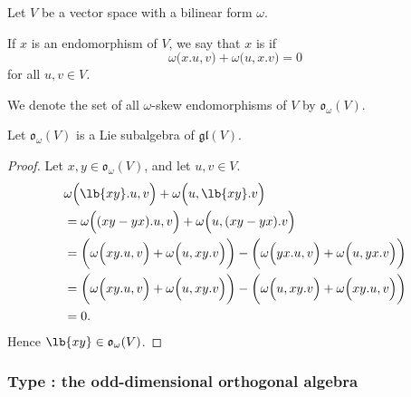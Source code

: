 \documentclass{article}
\DeclarePairedDelimiter\lb\lbrack\rbrack
\newcommand*\gl{\ensuremath{\mathfrak{gl}}}
\newcommand*\oalg{\ensuremath{\mathfrak{o}}}
\newcommand*\acts{.}
\begin{document}
\begin{definition}
    Let $V$ be a vector space with a bilinear form $\omega$.

    If $x$ is an endomorphism of $V$, we say that $x$ is  if
    \[
        \omega\Big(x\acts u, v\Big)
        + \omega\Big(u,x \acts v\Big)
        =
        0
    \]
    for all $u, v \in V$.

    We denote the set of all $\omega$-skew endomorphisms of $V$ by $\oalg_\omega(V)$.
\end{definition}

\begin{theorem}
    Let $\oalg_\omega(V)$ is a Lie subalgebra of $\gl(V)$.
\end{theorem}
\begin{proof}
    Let $x, y \in \oalg_\omega(V)$, and let $u, v \in V$.
    \begin{align*}
        &\omega\Big(
            \lb{xy} \acts u, v
        \Big)
        +
        \omega\Big(
            u, \lb{xy} \acts v
        \Big)
        \\
        &=
        \omega\Big(
            (xy - yx) \acts u, v
        \Big)
        +
        \omega\Big(
            u, (xy - yx) \acts v
        \Big)
        \\
        &=
        \bigg(
            \omega\Big(
                xy \acts u, v
            \Big)
            +
            \omega\Big(
                u, xy \acts v
            \Big)
        \bigg)
        -
        \bigg(
            \omega\Big(
                yx \acts u, v
            \Big)
            +
            \omega\Big(
                u, yx \acts v
            \Big)
        \bigg)
        \\
        &=
        \bigg(
            \omega\Big(
                xy \acts u, v
            \Big)
            +
            \omega\Big(
                u, xy \acts v
            \Big)
        \bigg)
        -
        \bigg(
            \omega\Big(
                u, xy \acts v
            \Big)
            +
            \omega\Big(
                xy \acts u, v
            \Big)
        \bigg)
        \\
        &=
        0.
    \end{align*}
    Hence $\lb{xy} \in \oalg_\omega(V)$.
\end{proof}


\subsubsection{Type \sfB: the odd-dimensional orthogonal algebra}
\end{document}
